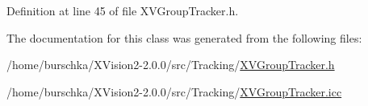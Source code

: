 Definition at line 45 of file XVGroup\-Tracker.h.

The documentation for this class was generated from the following files:\begin{CompactItemize}
\item 
/home/burschka/XVision2-2.0.0/src/Tracking/\hyperlink{XVGroupTracker.h-source}{XVGroup\-Tracker.h}\item 
/home/burschka/XVision2-2.0.0/src/Tracking/\hyperlink{XVGroupTracker.icc-source}{XVGroup\-Tracker.icc}\end{CompactItemize}
